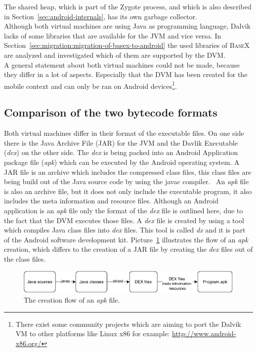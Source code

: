 The shared heap, which is part of the Zygote process, and which is also described in Section~\ref{sec:android-internals}, has its own garbage collector.~\cite{maia2010evaluating}
\\
Although both virtual machines are using Java as programming language, Dalvik lacks of some libraries that are available for the JVM and vice versa.
In Section~\ref{sec:migration:migration-of-basex-to-android} the used libraries of \textsc{BaseX} are analyzed and investigated which of them are supported by the DVM.\\
A general statement about both virtual machines could not be made, because they differ in a lot of aspects.
Especially that the DVM has been created for the mobile context and can only be ran on Android devices\footnote{There exist some community projects which are aiming to port the Dalvik VM to other platforms like Linux x86 for example: \url{http://www.android-x86.org/}}.



\subsection{Comparison of the two bytecode formats}
\label{sec:comparison-of-the-two-bytecode-formats}
Both virtual machines differ in their format of the executable files.
On one side there is the Java Archive File (JAR) for the JVM and the Davlik Executable (\textit{dex}) on the other side.
The \textit{dex} is being packed into an Android Application package file (\textit{apk}) which can be executed by the Android operating system.
A JAR file is an archive which includes the compressed class files, this class files are being build out of the Java source code by using the javac compiler.~\cite{pugh1999compressing} 
An \textit{apk} file is also an archive file, but it does not only include the executable program, it also includes the meta information and resource files.
Although an Android application is an \textit{apk} file only the format of the \textit{dex} file is outlined here, due to the fact that the DVM executes those files.
A \textit{dex} file is created by using a tool which compiles Java class files into \textit{dex} files.
This tool is called \textit{dx} and it is part of the Android software development kit.
Picture~\ref{fig:create-apk} illustrates the flow of an \textit{apk} creation, which differs to the creation of a JAR file by creating the \textit{dex} files out of the class files.\\
\begin{figure}[h]
\begin{center}
\includegraphics[scale=0.55]{images/create-apk.png} 
\caption{The creation flow of an \textit{apk} file.}
\label{fig:create-apk}
\end{center}
\end{figure}

